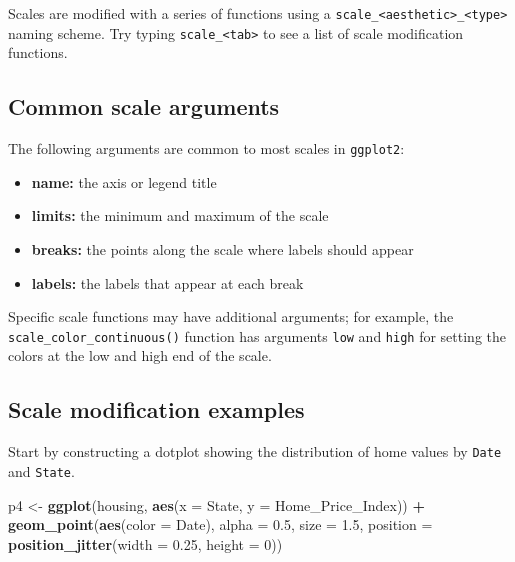 \documentclass[]{book}
\newenvironment{Shaded}{\begin{snugshade}}{\end{snugshade}}
\newcommand{\DataTypeTok}[1]{\textcolor[rgb]{0.13,0.29,0.53}{#1}}
\newcommand{\DecValTok}[1]{\textcolor[rgb]{0.00,0.00,0.81}{#1}}
\newcommand{\FloatTok}[1]{\textcolor[rgb]{0.00,0.00,0.81}{#1}}
\newcommand{\KeywordTok}[1]{\textcolor[rgb]{0.13,0.29,0.53}{\textbf{#1}}}
\newcommand{\NormalTok}[1]{#1}
\newcommand{\OperatorTok}[1]{\textcolor[rgb]{0.81,0.36,0.00}{\textbf{#1}}}
\newcommand{\StringTok}[1]{\textcolor[rgb]{0.31,0.60,0.02}{#1}}
\providecommand{\tightlist}{%
  \setlength{\itemsep}{0pt}\setlength{\parskip}{0pt}}
\begin{document}
Scales are modified with a series of functions using a \texttt{scale\_\textless{}aesthetic\textgreater{}\_\textless{}type\textgreater{}} naming scheme. Try typing \texttt{scale\_\textless{}tab\textgreater{}} to see a list of scale modification functions.

\hypertarget{common-scale-arguments}{%
\subsection{Common scale arguments}\label{common-scale-arguments}}

The following arguments are common to most scales in \texttt{ggplot2}:

\begin{itemize}
\tightlist
\item
  \textbf{name:} the axis or legend title
\item
  \textbf{limits:} the minimum and maximum of the scale
\item
  \textbf{breaks:} the points along the scale where labels should appear
\item
  \textbf{labels:} the labels that appear at each break
\end{itemize}

Specific scale functions may have additional arguments; for example, the \texttt{scale\_color\_continuous()} function has arguments \texttt{low} and \texttt{high} for setting the colors at the low and high end of the scale.

\hypertarget{scale-modification-examples}{%
\subsection{Scale modification examples}\label{scale-modification-examples}}

Start by constructing a dotplot showing the distribution of home values by \texttt{Date} and \texttt{State}.

\begin{Shaded}
\begin{Highlighting}[]
\NormalTok{p4 <-}\StringTok{ }\KeywordTok{ggplot}\NormalTok{(housing, }\KeywordTok{aes}\NormalTok{(}\DataTypeTok{x =}\NormalTok{ State, }\DataTypeTok{y =}\NormalTok{ Home_Price_Index)) }\OperatorTok{+}\StringTok{ }
\StringTok{    }\KeywordTok{geom_point}\NormalTok{(}\KeywordTok{aes}\NormalTok{(}\DataTypeTok{color =}\NormalTok{ Date), }\DataTypeTok{alpha =} \FloatTok{0.5}\NormalTok{, }\DataTypeTok{size =} \FloatTok{1.5}\NormalTok{,}
               \DataTypeTok{position =} \KeywordTok{position_jitter}\NormalTok{(}\DataTypeTok{width =} \FloatTok{0.25}\NormalTok{, }\DataTypeTok{height =} \DecValTok{0}\NormalTok{))}
\end{Highlighting}
\end{Shaded}
\end{document}
